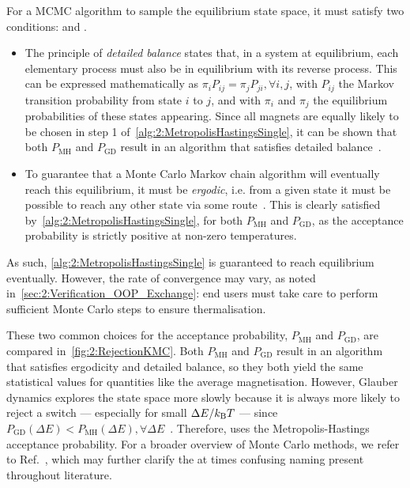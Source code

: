 For a MCMC algorithm to sample the equilibrium state space, it must satisfy two conditions:  and .
\begin{itemize}
	\item The principle of \textit{detailed balance} states that, in a system at equilibrium, each elementary process must also be in equilibrium with its reverse process.
	This can be expressed mathematically as $\pi_i P_{ij} = \pi_j P_{ji}, \forall i,j$, with $P_{ij}$ the Markov transition probability from state $i$ to $j$, and with $\pi_i$ and $\pi_j$ the equilibrium probabilities of these states appearing.
	Since all magnets are equally likely to be chosen in step 1 of~\cref{alg:2:MetropolisHastingsSingle}, it can be shown that both $P_\mathrm{MH}$ and $P_\mathrm{GD}$ result in an algorithm that satisfies detailed balance~\cite{kyimba2006comparisonIsingAlgorithms}.
	\item To guarantee that a Monte Carlo Markov chain algorithm will eventually reach this equilibrium, it must be \textit{ergodic}, i.e. from a given state it must be possible to reach any other state via some route~\cite{kyimba2006comparisonIsingAlgorithms}.
	This is clearly satisfied by~\cref{alg:2:MetropolisHastingsSingle}, for both $P_\mathrm{MH}$ and $P_\mathrm{GD}$, as the acceptance probability is strictly positive at non-zero temperatures.
\end{itemize}
As such, \cref{alg:2:MetropolisHastingsSingle} is guaranteed to reach equilibrium eventually.
However, the rate of convergence may vary, as noted in~\cref{sec:2:Verification_OOP_Exchange}: end users must take care to perform sufficient Monte Carlo steps to ensure thermalisation. %


These two common choices for the acceptance probability, $P_\mathrm{MH}$ and $P_\mathrm{GD}$, are compared in~\cref{fig:2:RejectionKMC}.
Both $P_\mathrm{MH}$ and $P_\mathrm{GD}$ result in an algorithm that satisfies ergodicity and detailed balance, so they both yield the same statistical values for quantities like the average magnetisation.
However, Glauber dynamics explores the state space more slowly because it is always more likely to reject a switch --- especially for small $\Delta E / \kBT$ --- since $P_\mathrm{GD}(\Delta E) < P_\mathrm{MH}(\Delta E), \forall \Delta E$~\cite{jang2004stochastic}.
Therefore, \hotspice uses the Metropolis-Hastings acceptance probability.
For a broader overview of Monte Carlo methods, we refer to Ref.~\cite{IntroductionMC}, which may further clarify the at times confusing naming present throughout literature.

